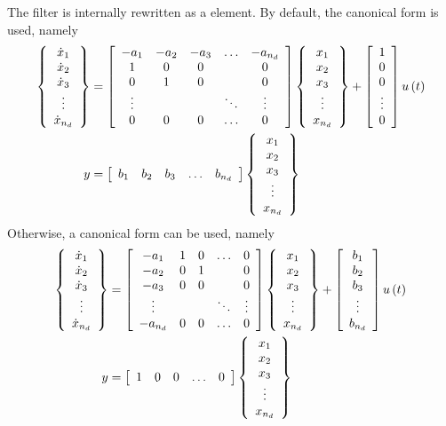 The filter is internally rewritten as a  element.
By default, the  canonical form is used, namely
\begin{align*}
	\cubr{\cvvect{
		\dot{x}_1 \\
		\dot{x}_2 \\
		\dot{x}_3 \\
		\vdots \\
		\dot{x}_{n_d}
	}} &= \sqbr{\matr{ccccc}{
		-a_1 & -a_2 & -a_3 & \ldots & -a_{n_d} \\
		1 & 0 & 0 & & 0 \\
		0 & 1 & 0 & & 0 \\
		\vdots & & & \ddots & \vdots \\
		0 & 0 & 0 & \ldots & 0
	}} \cubr{\cvvect{
		x_1 \\
		x_2 \\
		x_3 \\
		\vdots \\
		x_{n_d}
	}} + \sqbr{\cvvect{
		1 \\
		0 \\
		0 \\
		\vdots \\
		0
	}} u\plbr{t} \\
	y &= \sqbr{\matr{ccccc}{
		b_1 & b_2 & b_3 & \ldots & b_{n_d}
	}} \cubr{\cvvect{
		x_1 \\
		x_2 \\
		x_3 \\
		\vdots \\
		x_{n_d}
	}}
\end{align*}
Otherwise, a  canonical form can be used, namely
\begin{align*}
	\cubr{\cvvect{
		\dot{x}_1 \\
		\dot{x}_2 \\
		\dot{x}_3 \\
		\vdots \\
		\dot{x}_{n_d}
	}} &= \sqbr{\matr{ccccc}{
		-a_1 & 1 & 0 & \ldots & 0 \\
		-a_2 & 0 & 1 & & 0 \\
		-a_3 & 0 & 0 & & 0 \\
		\vdots & & & \ddots & \vdots \\
		-a_{n_d} & 0 & 0 & \ldots & 0
	}} \cubr{\cvvect{
		x_1 \\
		x_2 \\
		x_3 \\
		\vdots \\
		x_{n_d}
	}} + \sqbr{\cvvect{
		b_1 \\
		b_2 \\
		b_3 \\
		\vdots \\
		b_{n_d}
	}} u\plbr{t} \\
	y &= \sqbr{\matr{ccccc}{
		1 & 0 & 0 & \ldots & 0
	}} \cubr{\cvvect{
		x_1 \\
		x_2 \\
		x_3 \\
		\vdots \\
		x_{n_d}
	}}
\end{align*}
